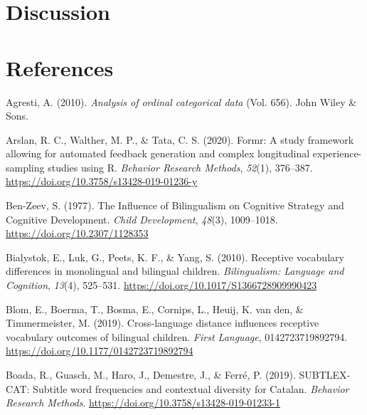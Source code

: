 \documentclass[
  english,
  man,man,floatsintext]{apa6}
\newlength{\cslhangindent}
\newenvironment{cslreferences}%
  {\setlength{\parindent}{0pt}%
  \everypar{\setlength{\hangindent}{\cslhangindent}}\ignorespaces}%
  {\par}
\begin{document}
\hypertarget{discussion}{%
\section{Discussion}\label{discussion}}

\hypertarget{references}{%
\section{References}\label{references}}

\begingroup
\setlength{\parindent}{-0.5in}
\setlength{\leftskip}{0.5in}

\hypertarget{refs}{}
\begin{cslreferences}
\leavevmode\hypertarget{ref-agresti_analysis_2010}{}%
Agresti, A. (2010). \emph{Analysis of ordinal categorical data} (Vol. 656). John Wiley \& Sons.

\leavevmode\hypertarget{ref-arslan_formr_2020}{}%
Arslan, R. C., Walther, M. P., \& Tata, C. S. (2020). Formr: A study framework allowing for automated feedback generation and complex longitudinal experience-sampling studies using R. \emph{Behavior Research Methods}, \emph{52}(1), 376--387. \url{https://doi.org/10.3758/s13428-019-01236-y}

\leavevmode\hypertarget{ref-ben-zeev_influence_1977}{}%
Ben-Zeev, S. (1977). The Influence of Bilingualism on Cognitive Strategy and Cognitive Development. \emph{Child Development}, \emph{48}(3), 1009--1018. \url{https://doi.org/10.2307/1128353}

\leavevmode\hypertarget{ref-bialystok_receptive_2010}{}%
Bialystok, E., Luk, G., Peets, K. F., \& Yang, S. (2010). Receptive vocabulary differences in monolingual and bilingual children. \emph{Bilingualism: Language and Cognition}, \emph{13}(4), 525--531. \url{https://doi.org/10.1017/S1366728909990423}

\leavevmode\hypertarget{ref-blom_cross-language_2019}{}%
Blom, E., Boerma, T., Bosma, E., Cornips, L., Heuij, K. van den, \& Timmermeister, M. (2019). Cross-language distance influences receptive vocabulary outcomes of bilingual children. \emph{First Language}, 0142723719892794. \url{https://doi.org/10.1177/0142723719892794}

\leavevmode\hypertarget{ref-boada_subtlex-cat_2019}{}%
Boada, R., Guasch, M., Haro, J., Demestre, J., \& Ferré, P. (2019). SUBTLEX-CAT: Subtitle word frequencies and contextual diversity for Catalan. \emph{Behavior Research Methods}. \url{https://doi.org/10.3758/s13428-019-01233-1}


\end{cslreferences}
\end{document}
